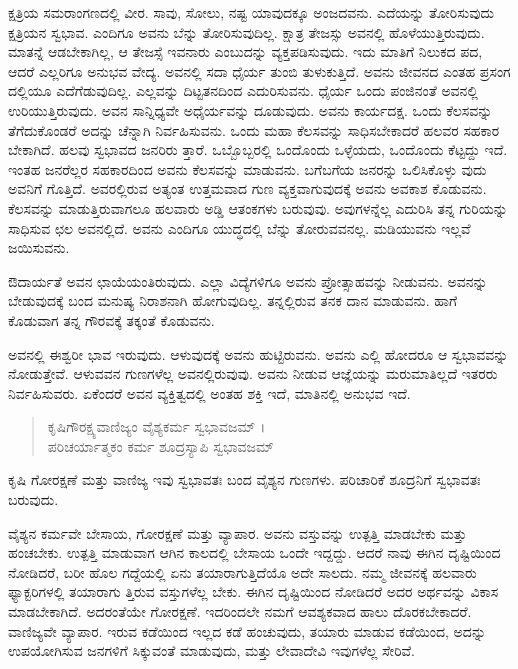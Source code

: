 ಕ್ಷತ್ರಿಯ ಸಮರಾಂಗಣದಲ್ಲಿ ವೀರ. ಸಾವು, ಸೋಲು, ನಷ್ಟ ಯಾವುದಕ್ಕೂ ಅಂಜದವನು. ಎದೆಯನ್ನು ತೋರಿಸುವುದು ಕ್ಷತ್ರಿಯನ ಸ್ವಭಾವ. ಎಂದಿಗೂ ಅವನು ಬೆನ್ನು ತೋರಿಸುವುದಿಲ್ಲ. ಕ್ಷಾತ್ರ ತೇಜಸ್ಸು ಅವನಲ್ಲಿ ಹೊಳೆಯುತ್ತಿರುವುದು. ಮಾತನ್ನೆ ಆಡಬೇಕಾಗಿಲ್ಲ, ಆ ತೇಜಸ್ಸೆ ಇವನಾರು ಎಂಬುದನ್ನು ವ್ಯಕ್ತಪಡಿಸುವುದು. ಇದು ಮಾತಿಗೆ ನಿಲುಕದ ಪದ, ಆದರೆ ಎಲ್ಲರಿಗೂ ಅನುಭವ ವೇದ್ಯ. ಅವನಲ್ಲಿ ಸದಾ ಧೈರ್ಯ ತುಂಬಿ ತುಳುಕುತ್ತಿದೆ. ಅವನು ಜೀವನದ ಎಂತಹ ಪ್ರಸಂಗ ದಲ್ಲಿಯೂ ಎದೆಗೆಡುವುದಿಲ್ಲ. ಎಲ್ಲವನ್ನು ದಿಟ್ಟತನದಿಂದ ಎದುರಿಸುವನು. ಧೈರ್ಯ ಒಂದು ಪಂಜಿನಂತೆ ಅವನಲ್ಲಿ ಉರಿಯುತ್ತಿರುವುದು. ಅವನ ಸಾನ್ನಿಧ್ಯವೇ ಅಧೈರ್ಯವನ್ನು ದೂಡುವುದು. ಅವನು ಕಾರ್ಯದಕ್ಷ. ಒಂದು ಕೆಲಸವನ್ನು ತೆಗೆದುಕೊಂಡರೆ ಅದನ್ನು ಚೆನ್ನಾಗಿ ನಿರ್ವಹಿಸುವನು. ಒಂದು ಮಹಾ ಕೆಲಸವನ್ನು ಸಾಧಿಸಬೇಕಾದರೆ ಹಲವರ ಸಹಕಾರ ಬೇಕಾಗಿದೆ. ಹಲವು ಸ್ವಭಾವದ ಜನರಿರು ತ್ತಾರೆ. ಒಬ್ಬೊಬ್ಬರಲ್ಲಿ ಒಂದೊಂದು ಒಳ್ಳೆಯದು, ಒಂದೊಂದು ಕೆಟ್ಟದ್ದು ಇದೆ. ಇಂತಹ ಜನರೆಲ್ಲರ ಸಹಕಾರದಿಂದ ಅವನು ಕೆಲಸವನ್ನು ಮಾಡುವನು. ಬಗೆಬಗೆಯ ಜನರನ್ನು ಒಲಿಸಿಕೊಳ್ಳು ವುದು ಅವನಿಗೆ ಗೊತ್ತಿದೆ. ಅವರಲ್ಲಿರುವ ಅತ್ಯಂತ ಉತ್ತಮವಾದ ಗುಣ ವ್ಯಕ್ತವಾಗುವುದಕ್ಕೆ ಅವನು ಅವಕಾಶ ಕೊಡುವನು. ಕೆಲಸವನ್ನು ಮಾಡುತ್ತಿರುವಾಗಲೂ ಹಲವಾರು ಅಡ್ಡಿ ಆತಂಕಗಳು ಬರುವುವು. ಅವುಗಳನ್ನೆಲ್ಲ ಎದುರಿಸಿ ತನ್ನ ಗುರಿಯನ್ನು ಸಾಧಿಸುವ ಛಲ ಅವನಲ್ಲಿದೆ. ಅವನು ಎಂದಿಗೂ ಯುದ್ಧದಲ್ಲಿ ಬೆನ್ನು ತೋರುವವನಲ್ಲ. ಮಡಿಯುವನು ಇಲ್ಲವೆ ಜಯಿಸುವನು.

ಔದಾರ್ಯತೆ ಅವನ ಛಾಯೆಯಂತಿರುವುದು. ಎಲ್ಲಾ ವಿದ್ಯೆಗಳಿಗೂ ಅವನು ಪ್ರೋತ್ಸಾಹವನ್ನು ನೀಡುವನು. ಅವನನ್ನು ಬೇಡುವುದಕ್ಕೆ ಬಂದ ಮನುಷ್ಯ ನಿರಾಶನಾಗಿ ಹೋಗುವುದಿಲ್ಲ. ತನ್ನಲ್ಲಿರುವ ತನಕ ದಾನ ಮಾಡುವನು. ಹಾಗೆ ಕೊಡುವಾಗ ತನ್ನ ಗೌರವಕ್ಕೆ ತಕ್ಕಂತೆ ಕೊಡುವನು.

ಅವನಲ್ಲಿ ಈಶ್ವರೀ ಭಾವ ಇರುವುದು. ಆಳುವುದಕ್ಕೆ ಅವನು ಹುಟ್ಟಿರುವನು. ಅವನು ಎಲ್ಲಿ ಹೋದರೂ ಆ ಸ್ವಭಾವವನ್ನು ನೋಡುತ್ತೇವೆ. ಆಳುವವನ ಗುಣಗಳೆಲ್ಲ ಅವನಲ್ಲಿರುವುವು. ಅವನು ನೀಡುವ ಆಜ್ಞೆಯನ್ನು ಮರುಮಾತಿಲ್ಲದೆ ಇತರರು ನಿರ್ವಹಿಸುವರು. ಏಕೆಂದರೆ ಅವನ ವ್ಯಕ್ತಿತ್ವದಲ್ಲಿ ಅಂತಹ ಶಕ್ತಿ ಇದೆ, ಮಾತಿನಲ್ಲಿ ಅನುಭವ ಇದೆ.

\begin{verse}
ಕೃಷಿಗೌರಕ್ಷ್ಯವಾಣಿಜ್ಯಂ ವೈಶ್ಯಕರ್ಮ ಸ್ವಭಾವಜಮ್ ।\\ಪರಿಚರ್ಯಾತ್ಮಕಂ ಕರ್ಮ ಶೂದ್ರಸ್ಯಾಪಿ ಸ್ವಭಾವಜಮ್ 
\end{verse}

{\small ಕೃಷಿ ಗೋರಕ್ಷಣೆ ಮತ್ತು ವಾಣಿಜ್ಯ ಇವು ಸ್ವಭಾವತಃ ಬಂದ ವೈಶ್ಯನ ಗುಣಗಳು. ಪರಿಚಾರಿಕೆ ಶೂದ್ರನಿಗೆ ಸ್ವಭಾವತಃ ಬರುವುದು.}

ವೈಶ್ಯನ ಕರ್ಮವೇ ಬೇಸಾಯ, ಗೋರಕ್ಷಣೆ ಮತ್ತು ವ್ಯಾಪಾರ. ಅವನು ವಸ್ತುವನ್ನು ಉತ್ಪತ್ತಿ ಮಾಡಬೇಕು ಮತ್ತು ಹಂಚಬೇಕು. ಉತ್ಪತ್ತಿ ಮಾಡುವಾಗ ಆಗಿನ ಕಾಲದಲ್ಲಿ ಬೇಸಾಯ ಒಂದೇ ಇದ್ದದ್ದು. ಆದರೆ ನಾವು ಈಗಿನ ದೃಷ್ಟಿಯಿಂದ ನೋಡಿದರೆ, ಬರೀ ಹೊಲ ಗದ್ದೆಯಲ್ಲಿ ಏನು ತಯಾರಾಗುತ್ತಿದೆಯೊ ಅದೇ ಸಾಲದು. ನಮ್ಮ ಜೀವನಕ್ಕೆ ಹಲವಾರು ಫ್ಯಾಕ್ಟರಿಗಳಲ್ಲಿ ತಯಾರಾಗು ತ್ತಿರುವ ವಸ್ತುಗಳೆಲ್ಲ ಬೇಕು. ಈಗಿನ ದೃಷ್ಟಿಯಿಂದ ನೋಡಿದರೆ ಅದರ ಅರ್ಥವನ್ನು ವಿಕಾಸ ಮಾಡಬೇಕಾಗಿದೆ. ಅದರಂತೆಯೇ ಗೋರಕ್ಷಣೆ. ಇದರಿಂದಲೇ ನಮಗೆ ಆವಶ್ಯಕವಾದ ಹಾಲು ದೊರಕಬೇಕಾದರೆ. ವಾಣಿಜ್ಯವೇ ವ್ಯಾಪಾರ. ಇರುವ ಕಡೆಯಿಂದ ಇಲ್ಲದ ಕಡೆ ಹಂಚುವುದು, ತಯಾರು ಮಾಡುವ ಕಡೆಯಿಂದ, ಅದನ್ನು ಉಪಯೋಗಿಸುವ ಜನಗಳಿಗೆ ಸಿಕ್ಕುವಂತೆ ಮಾಡುವುದು, ಮತ್ತು ಲೇವಾದೇವಿ ಇವುಗಳೆಲ್ಲ ಸೇರಿವೆ.

